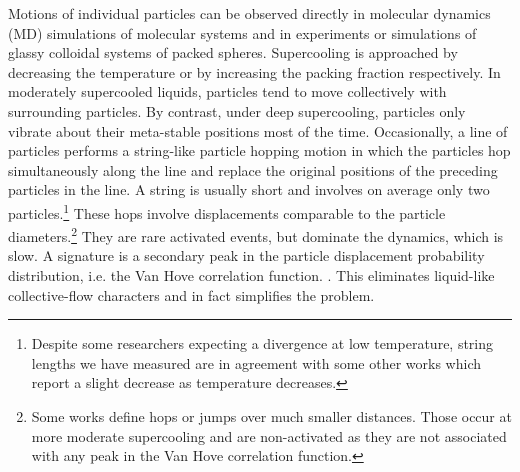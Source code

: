 \documentclass[aps,rmp,tighten,twocolumn,floatfix,a4paper,longbibliography]{revtex4-1}
\begin{document}
{
Motions of individual particles can be observed directly in molecular dynamics (MD) simulations of molecular systems and in experiments or simulations of glassy colloidal systems of packed spheres. Supercooling is approached by decreasing the temperature or by increasing the packing fraction respectively. 
In moderately supercooled liquids, particles tend to move collectively with surrounding particles. By contrast, under deep supercooling, particles only vibrate about their meta-stable positions most of the time. %
Occasionally, a line of particles performs a {string-like particle hopping motion} in which the particles hop simultaneously along the line and replace the original positions of the preceding particles in the line.
A string is usually short and involves on average only two particles.\footnote{Despite some researchers expecting a divergence at low temperature, string lengths we have measured are in agreement with some other works which report a slight decrease as temperature decreases.}  These hops involve displacements comparable to the particle diameters.\footnote{Some works define hops or jumps over much smaller distances. Those occur at more moderate supercooling and are non-activated as they are not associated with any peak in the Van Hove correlation function.}  They are rare activated events, but dominate the dynamics, which is slow. A signature is a secondary peak in the particle displacement probability distribution, i.e. the Van Hove correlation function. . This eliminates liquid-like collective-flow characters and in fact simplifies the problem.
}



\end{document}
